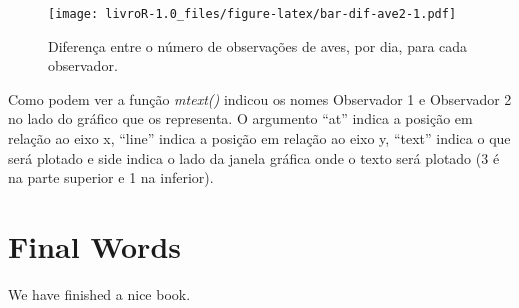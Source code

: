 \documentclass[]{book}
\begin{document}
\begin{figure}
\centering
\texttt{[image: livroR-1.0\_files/figure-latex/bar-dif-ave2-1.pdf]}
\caption{\label{fig:bar-dif-ave2}Diferença entre o número de observações de aves, por dia, para cada observador.}
\end{figure}

Como podem ver a função \emph{mtext()} indicou os nomes Observador 1 e Observador 2 no lado do gráfico que os representa. O argumento ``at'' indica a posição em relação ao eixo x, ``line'' indica a posição em relação ao eixo y, ``text'' indica o que será plotado e side indica o lado da janela gráfica onde o texto será plotado (3 é na parte superior e 1 na inferior).

\hypertarget{final-words}{%
\chapter{Final Words}\label{final-words}}

We have finished a nice book.


\end{document}
